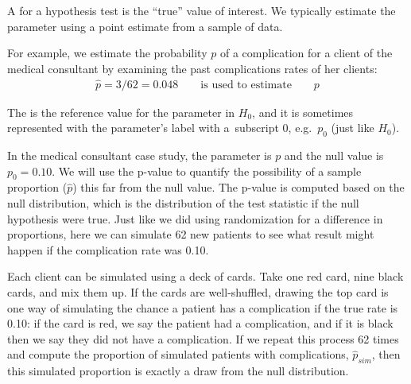 \begin{termBox}{
A  for a hypothesis test is the ``true'' value of interest. We typically estimate the parameter using a point estimate from a sample of data. \vspace{3mm}

For example, we estimate the probability $p$ of a complication for a client of the medical consultant by examining the past complications rates of her clients:\vspace{-2mm}
\begin{align*}
\hat{p} = 3 / 62 = 0.048\qquad\text{is used to estimate}\qquad p
\end{align*}}
\end{termBox}


\begin{termBox}{
The  is the reference value for the parameter in $H_0$, and it is sometimes represented with the parameter's label with a~subscript 0, e.g.~$p_0$ (just like $H_0$).}
\end{termBox}

In the medical consultant case study, the parameter is $p$ and the null value is $p_0 = 0.10$. We will use the p-value to quantify the possibility of a sample proportion ($\hat{p}$) this far from the null value. The p-value is computed based on the null distribution, which is the distribution of the test statistic if the null hypothesis were true. Just like we did using randomization for a difference in proportions, here we can simulate 62 new patients to see what result might happen if the complication rate was 0.10.

Each client can be simulated using a deck of cards. Take one red card, nine black cards, and mix them up. If the cards are well-shuffled, drawing the top card is one way of simulating the chance a patient has a complication if the true rate is 0.10: if the card is red, we say the patient had a complication, and if it is black then we say they did not have a complication. If we repeat this process 62 times and compute the proportion of simulated patients with complications, $\hat{p}_{sim}$, then this simulated proportion is exactly a draw from the null distribution.

